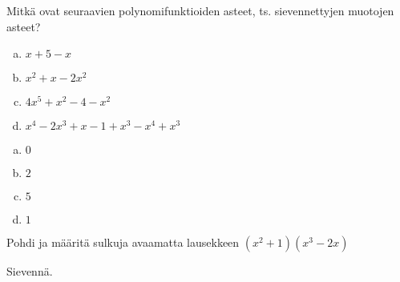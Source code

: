 \begin{tehtavasivu}
\begin{tehtava}
	Mitkä ovat seuraavien polynomifunktioiden asteet, ts. sievennettyjen muotojen asteet?
	\begin{enumerate}[a)]
		\item $x+5-x$
		\item $x^2+x-2x^2$
		\item $4x^5+x^2-4-x^2$
		\item $x^4-2x^3+x-1+x^3-x^4+x^3$
	\end{enumerate}

	\begin{vastaus}
		\begin{enumerate}[a)]
			\item $0$
			\item $2$
			\item $5$
			\item $1$
		\end{enumerate}
	\end{vastaus}
\end{tehtava}

\begin{tehtava}
    Pohdi ja määritä sulkuja avaamatta lausekkeen $(x^2+1)(x^3-2x)$
    \begin{alakohdat}
    \end{alakohdat}
    \begin{vastaus}
        \begin{alakohdat}
        \end{alakohdat}
    \end{vastaus}
\end{tehtava}

\begin{tehtava}
    Sievennä.
    \begin{alakohdat}
    \end{alakohdat}
    \begin{vastaus}
        \begin{alakohdat}
        \end{alakohdat}
    \end{vastaus}
\end{tehtava}



\end{tehtavasivu}
